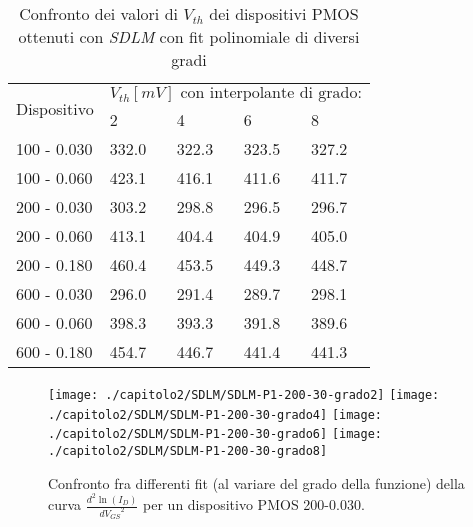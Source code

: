 \begin{table}[h]
  \renewcommand{\arraystretch}{1.3}
  \centering
  \begin{tabular}{m{2.1cm} m{2cm} m{2cm} m{2cm} m{2cm}}
    \toprule
    \multirow{2}{*}{Dispositivo} & \multicolumn{4}{c}{$V_{th} [mV] \text{ con interpolante di grado:}$}                         \\
    \cmidrule{2-5}
                                 & 2                                                                    & 4     & 6     & 8     \\
    \midrule
    100 - 0.030                  & 332.0                                                                & 322.3 & 323.5 & 327.2 \\
    \hline
    100 - 0.060                  & 423.1                                                                & 416.1 & 411.6 & 411.7 \\
    \hline
    200 - 0.030                  & 303.2                                                                & 298.8 & 296.5 & 296.7 \\
    \hline
    200 - 0.060                  & 413.1                                                                & 404.4 & 404.9 & 405.0 \\
    \hline
    200 - 0.180                  & 460.4                                                                & 453.5 & 449.3 & 448.7 \\
    \hline
    600 - 0.030                  & 296.0                                                                & 291.4 & 289.7 & 298.1 \\
    \hline
    600 - 0.060                  & 398.3                                                                & 393.3 & 391.8 & 389.6 \\
    \hline
    600 - 0.180                  & 454.7                                                                & 446.7 & 441.4 & 441.3 \\
    \hline
  \end{tabular}
  \caption{Confronto dei valori di $V_{th}$ dei dispositivi PMOS ottenuti con \emph{SDLM} con fit polinomiale di diversi gradi}
  \label{tab:GradiSDLM}
\end{table}

\begin{figure}[h!]
  \centering
  \texttt{[image: ./capitolo2/SDLM/SDLM-P1-200-30-grado2]}
  \texttt{[image: ./capitolo2/SDLM/SDLM-P1-200-30-grado4]}
  \texttt{[image: ./capitolo2/SDLM/SDLM-P1-200-30-grado6]}
  \texttt{[image: ./capitolo2/SDLM/SDLM-P1-200-30-grado8]}
  \caption{Confronto fra differenti fit (al variare del grado della funzione) della curva $\frac{d^2 \ln(I_D)}{d {V_{GS}}^2}$ per un dispositivo PMOS 200-0.030.}
  \label{fig:GradiSDLM}
\end{figure}

